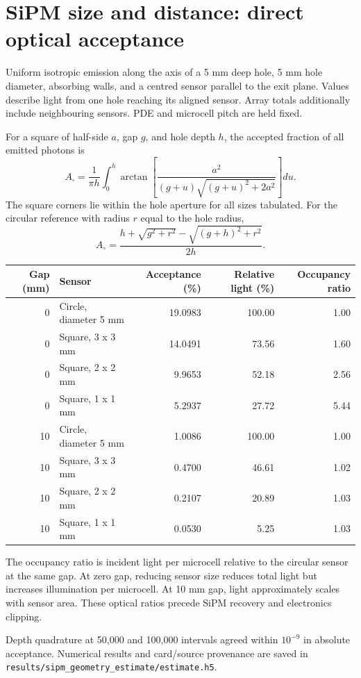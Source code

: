 \documentclass{article}
\begin{document}
\section*{SiPM size and distance: direct optical acceptance}
Uniform isotropic emission along the axis of a 5 mm deep hole, 5 mm hole diameter, absorbing walls, and a centred sensor parallel to the exit plane. Values describe light from one hole reaching its aligned sensor. Array totals additionally include neighbouring sensors. PDE and microcell pitch are held fixed.

For a square of half-side $a$, gap $g$, and hole depth $h$, the accepted
fraction of all emitted photons is
\[
A_\square=\frac{1}{\pi h}\int_0^h
\arctan\!\left[\frac{a^2}{(g+u)\sqrt{(g+u)^2+2a^2}}\right]du.
\]
The square corners lie within the hole aperture for all sizes tabulated.
For the circular reference with radius $r$ equal to the hole radius,
\[
A_\circ=\frac{h+\sqrt{g^2+r^2}-\sqrt{(g+h)^2+r^2}}{2h}.
\]
\begin{center}\small
\begin{tabular}{rlrrr}\toprule
Gap (mm)&Sensor&Acceptance (\%)&Relative light (\%)&Occupancy ratio\\\midrule
0 & Circle, diameter 5 mm & 19.0983 & 100.00 & 1.00 \\
0 & Square, 3 x 3 mm & 14.0491 & 73.56 & 1.60 \\
0 & Square, 2 x 2 mm & 9.9653 & 52.18 & 2.56 \\
0 & Square, 1 x 1 mm & 5.2937 & 27.72 & 5.44 \\
10 & Circle, diameter 5 mm & 1.0086 & 100.00 & 1.00 \\
10 & Square, 3 x 3 mm & 0.4700 & 46.61 & 1.02 \\
10 & Square, 2 x 2 mm & 0.2107 & 20.89 & 1.03 \\
10 & Square, 1 x 1 mm & 0.0530 & 5.25 & 1.03 \\
\bottomrule\end{tabular}\end{center}
The occupancy ratio is incident light per microcell relative to the circular sensor at the same gap. At zero gap, reducing sensor size reduces total light but increases illumination per microcell. At 10 mm gap, light approximately scales with sensor area. These optical ratios precede SiPM recovery and electronics clipping.

Depth quadrature at 50,000 and 100,000 intervals agreed within $10^{-9}$
in absolute acceptance. Numerical results and card/source provenance are
saved in \texttt{results/sipm\_geometry\_estimate/estimate.h5}.
\end{document}

